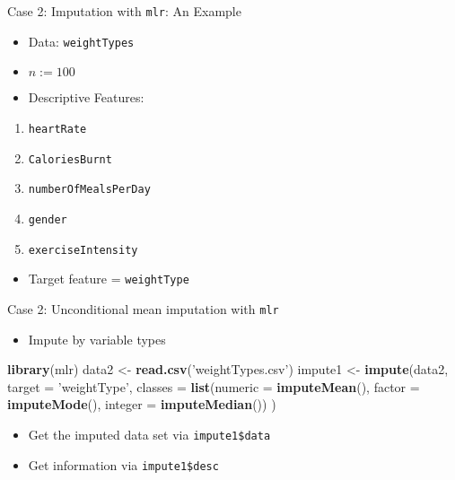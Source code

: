 \documentclass[ignorenonframetext,]{beamer}
\newenvironment{Shaded}{\begin{snugshade}}{\end{snugshade}}
\newcommand{\KeywordTok}[1]{\textcolor[rgb]{0.13,0.29,0.53}{\textbf{#1}}}
\newcommand{\DataTypeTok}[1]{\textcolor[rgb]{0.13,0.29,0.53}{#1}}
\newcommand{\StringTok}[1]{\textcolor[rgb]{0.31,0.60,0.02}{#1}}
\newcommand{\NormalTok}[1]{#1}
\providecommand{\tightlist}{%
  \setlength{\itemsep}{0pt}\setlength{\parskip}{0pt}}
\begin{document}
\begin{frame}[fragile]{Case 2: Imputation with \texttt{mlr}: An Example}

\begin{itemize}[<+->]
\tightlist
\item
  Data: \texttt{weightTypes}
\item
  \(n:=100\)
\item
  Descriptive Features:
\end{itemize}

\begin{enumerate}[<+->]
\def\labelenumi{\arabic{enumi}.}
\tightlist
\item
  \texttt{heartRate}
\item
  \texttt{CaloriesBurnt}
\item
  \texttt{numberOfMealsPerDay}
\item
  \texttt{gender}
\item
  \texttt{exerciseIntensity}
\end{enumerate}

\begin{itemize}[<+->]
\tightlist
\item
  Target feature = \texttt{weightType}
\end{itemize}

\end{frame}

\begin{frame}[fragile]{Case 2: Unconditional mean imputation with
\texttt{mlr}}

\begin{itemize}[<+->]
\tightlist
\item
  Impute by variable types
\end{itemize}

\begin{Shaded}
\begin{Highlighting}[]
\KeywordTok{library}\NormalTok{(mlr)}
\NormalTok{data2   <-}\StringTok{ }\KeywordTok{read.csv}\NormalTok{(}\StringTok{'weightTypes.csv'}\NormalTok{)}
\NormalTok{impute1 <-}\StringTok{ }\KeywordTok{impute}\NormalTok{(data2, }\DataTypeTok{target =} \StringTok{'weightType'}\NormalTok{, }
                  \DataTypeTok{classes =} \KeywordTok{list}\NormalTok{(}\DataTypeTok{numeric =} \KeywordTok{imputeMean}\NormalTok{(),}
                                 \DataTypeTok{factor  =} \KeywordTok{imputeMode}\NormalTok{(),}
                                 \DataTypeTok{integer =} \KeywordTok{imputeMedian}\NormalTok{())}
\NormalTok{                  )}
\end{Highlighting}
\end{Shaded}

\begin{itemize}[<+->]
\tightlist
\item
  Get the imputed data set via \texttt{impute1\$data}
\item
  Get information via \texttt{impute1\$desc}
\end{itemize}

\end{frame}
\end{document}
